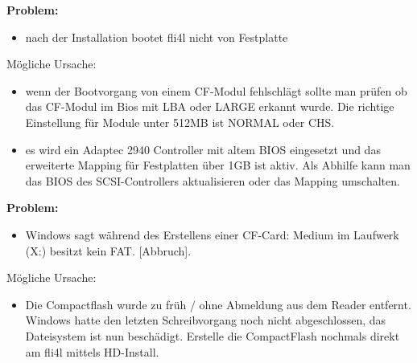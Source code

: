     \textbf{Problem:}
    \begin{itemize}
    \item nach der Installation bootet fli4l nicht von Festplatte
    \end{itemize}
    
    Mögliche Ursache:
    \begin{itemize}
    \item wenn der Bootvorgang von einem CF-Modul fehlschlägt sollte man prüfen
    ob das CF-Modul im Bios mit LBA oder LARGE erkannt wurde. Die richtige 
    Einstellung für Module unter 512MB ist NORMAL oder CHS.
    \item es wird ein Adaptec 2940 Controller mit altem BIOS eingesetzt und das 
    erweiterte Mapping für Festplatten über 1GB ist aktiv. Als Abhilfe kann man 
    das BIOS des SCSI-Controllers aktualisieren oder das Mapping umschalten.
    \end{itemize}

    \textbf{Problem:}
    \begin{itemize}
    \item Windows sagt während des Erstellens einer CF-Card: \glqq{}Medium im Laufwerk
      (X:) besitzt kein FAT. [Abbruch]\grqq{}.
    \end{itemize}

    Mögliche Ursache:
    \begin{itemize}
    \item Die Compactflash wurde zu früh / ohne Abmeldung aus dem Reader entfernt.
    Windows hatte den letzten Schreibvorgang noch nicht abgeschlossen, das
    Dateisystem ist nun beschädigt. Erstelle die CompactFlash nochmals
    direkt am fli4l mittels HD-Install.
    \end{itemize}
